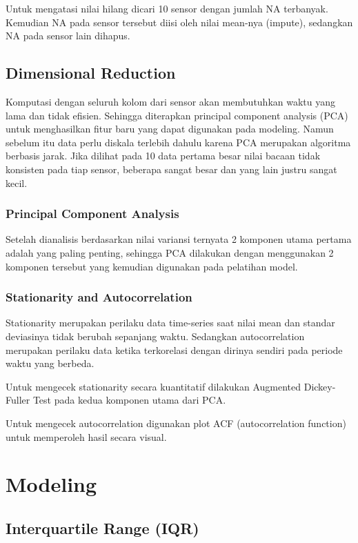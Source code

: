     Untuk mengatasi nilai hilang dicari 10 sensor dengan jumlah NA terbanyak. Kemudian NA pada sensor tersebut diisi oleh nilai mean-nya (impute), sedangkan NA pada sensor lain dihapus.

    \subsection{Dimensional Reduction}

    Komputasi dengan seluruh kolom dari sensor akan membutuhkan waktu yang lama dan tidak efisien. Sehingga diterapkan principal component analysis (PCA) untuk menghasilkan fitur baru yang dapat digunakan pada modeling. Namun sebelum itu data perlu diskala terlebih dahulu karena PCA merupakan algoritma berbasis jarak. Jika dilihat pada 10 data pertama besar nilai bacaan tidak konsisten pada tiap sensor, beberapa sangat besar dan yang lain justru sangat kecil.

        \subsubsection{Principal Component Analysis}

        Setelah dianalisis berdasarkan nilai variansi ternyata 2 komponen utama pertama adalah yang paling penting, sehingga PCA dilakukan dengan menggunakan 2 komponen tersebut yang kemudian digunakan pada pelatihan model.

        \subsubsection{Stationarity and Autocorrelation}

        Stationarity merupakan perilaku data time-series saat nilai mean dan standar deviasinya tidak berubah sepanjang waktu. Sedangkan autocorrelation merupakan perilaku data ketika terkorelasi dengan dirinya sendiri pada periode waktu yang berbeda.

        Untuk mengecek stationarity secara kuantitatif dilakukan Augmented Dickey-Fuller Test pada kedua komponen utama dari PCA.

        Untuk mengecek autocorrelation digunakan plot ACF (autocorrelation function) untuk memperoleh hasil secara visual.

\section{Modeling}

    \subsection{Interquartile Range (IQR)}

